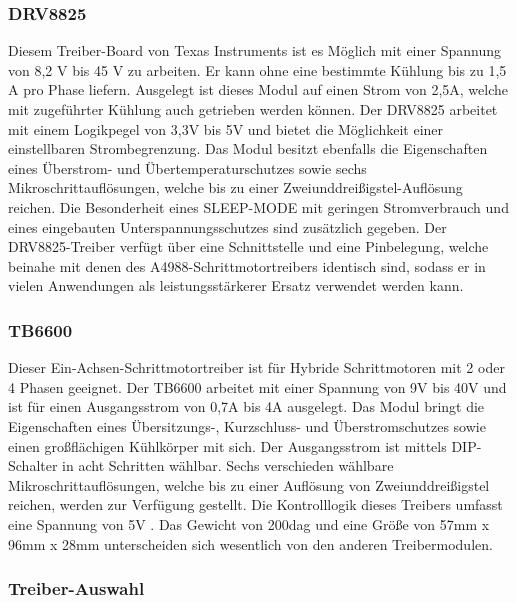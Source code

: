 \subsubsection{DRV8825}
Diesem Treiber-Board von Texas Instruments ist es Möglich mit einer Spannung von 8,2 V bis 45 V zu arbeiten.
Er kann ohne eine bestimmte Kühlung bis zu 1,5 A pro Phase liefern.
Ausgelegt ist dieses Modul auf einen Strom von 2,5A, welche mit zugeführter Kühlung auch getrieben werden können.
Der DRV8825 arbeitet mit einem Logikpegel von 3,3V bis 5V und bietet die Möglichkeit einer einstellbaren Strombegrenzung.
Das Modul besitzt ebenfalls die Eigenschaften eines Überstrom- und Übertemperaturschutzes sowie sechs Mikroschrittauflösungen, welche bis zu einer Zweiunddreißigstel-Auflösung reichen.
Die Besonderheit eines SLEEP-MODE mit geringen Stromverbrauch und eines eingebauten Unterspannungsschutzes sind zusätzlich gegeben.
Der DRV8825-Treiber verfügt über eine Schnittstelle und eine Pinbelegung, welche beinahe mit denen des A4988-Schrittmotortreibers identisch sind,
sodass er in vielen Anwendungen als leistungsstärkerer Ersatz verwendet werden kann.

\subsubsection{TB6600}
Dieser Ein-Achsen-Schrittmotortreiber ist für Hybride Schrittmotoren mit 2 oder 4 Phasen geeignet.
Der TB6600 arbeitet mit einer Spannung von 9V bis 40V und ist für einen Ausgangsstrom von 0,7A bis 4A ausgelegt.
Das Modul bringt die Eigenschaften eines Übersitzungs-, Kurzschluss- und Überstromschutzes sowie einen großflächigen Kühlkörper mit sich.
Der Ausgangsstrom ist mittels DIP-Schalter in acht Schritten wählbar.
Sechs verschieden wählbare Mikroschrittauflösungen, welche bis zu einer Auflösung von Zweiunddreißigstel reichen, werden zur Verfügung gestellt.
Die Kontrolllogik dieses Treibers umfasst eine Spannung von 5V .
Das Gewicht von 200dag und eine Größe von 57mm x 96mm x 28mm unterscheiden sich wesentlich von den anderen Treibermodulen.

\newpage

\subsubsection{Treiber-Auswahl}


